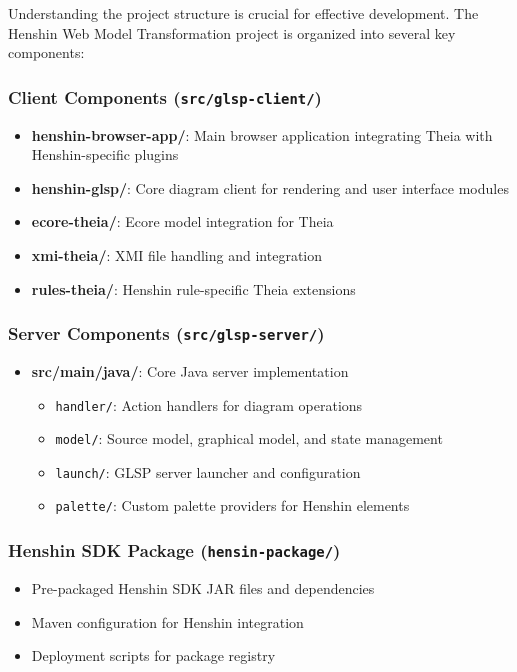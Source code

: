 Understanding the project structure is crucial for effective development. The Henshin Web Model Transformation project is organized into several key components:

\subsubsection{Client Components (\texttt{src/glsp-client/})}

\begin{itemize}
    \item \textbf{henshin-browser-app/}: Main browser application integrating Theia with Henshin-specific plugins
    \item \textbf{henshin-glsp/}: Core diagram client for rendering and user interface modules
    \item \textbf{ecore-theia/}: Ecore model integration for Theia
    \item \textbf{xmi-theia/}: XMI file handling and integration
    \item \textbf{rules-theia/}: Henshin rule-specific Theia extensions
\end{itemize}

\subsubsection{Server Components (\texttt{src/glsp-server/})}

\begin{itemize}
    \item \textbf{src/main/java/}: Core Java server implementation
    \begin{itemize}
        \item \texttt{handler/}: Action handlers for diagram operations
        \item \texttt{model/}: Source model, graphical model, and state management
        \item \texttt{launch/}: GLSP server launcher and configuration
        \item \texttt{palette/}: Custom palette providers for Henshin elements
    \end{itemize}
\end{itemize}

\subsubsection{Henshin SDK Package (\texttt{hensin-package/})}

\begin{itemize}
    \item Pre-packaged Henshin SDK JAR files and dependencies
    \item Maven configuration for Henshin integration
    \item Deployment scripts for package registry
\end{itemize}

